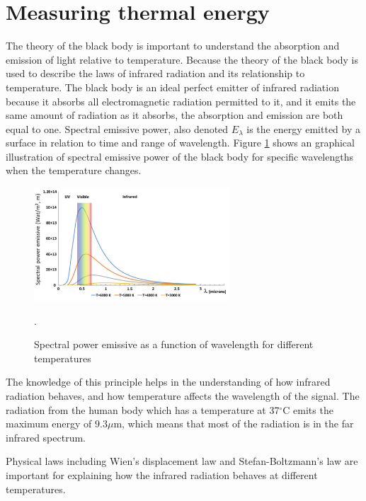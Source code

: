 \section{Measuring thermal energy}

The theory of the black body is important to understand the absorption and emission of light relative to temperature. Because the theory of the black body is used to describe the laws of infrared radiation and its relationship to temperature. The black body is an ideal perfect emitter of infrared radiation because it absorbs all electromagnetic radiation permitted to it, and it emits the same amount of radiation as it absorbs, the absorption and emission are both equal to one. 
Spectral emissive power, also denoted $E_\lambda$ is the energy emitted by a surface in relation to time and range of wavelength. Figure \ref{fig:Spectral} shows an graphical illustration of spectral emissive power of the black body for specific wavelengths when the temperature changes. \cite{ignacio2017} 

\begin{figure}[H]
	\centering	\includegraphics[width=0.65\textwidth]{figures/Spectral_power_emissive}
	\caption{Spectral power emissive as a function of wavelength for different temperatures \cite{ignacio2017}}.
	\label{fig:Spectral}
\end{figure} \vspace{-.3cm}

The knowledge of this principle helps in the understanding of how infrared radiation behaves, and how temperature affects the wavelength of the signal. 
The radiation from the human body which has a temperature at 37$^{\circ}$C emits the maximum energy of $9.3 \mu$m, which means that most of the radiation is in the far infrared spectrum.\cite{ignacio2017}

Physical laws including Wien's displacement law and Stefan-Boltzmann's law are important for explaining how the infrared radiation behaves at different temperatures. \cite{ignacio2017} 

